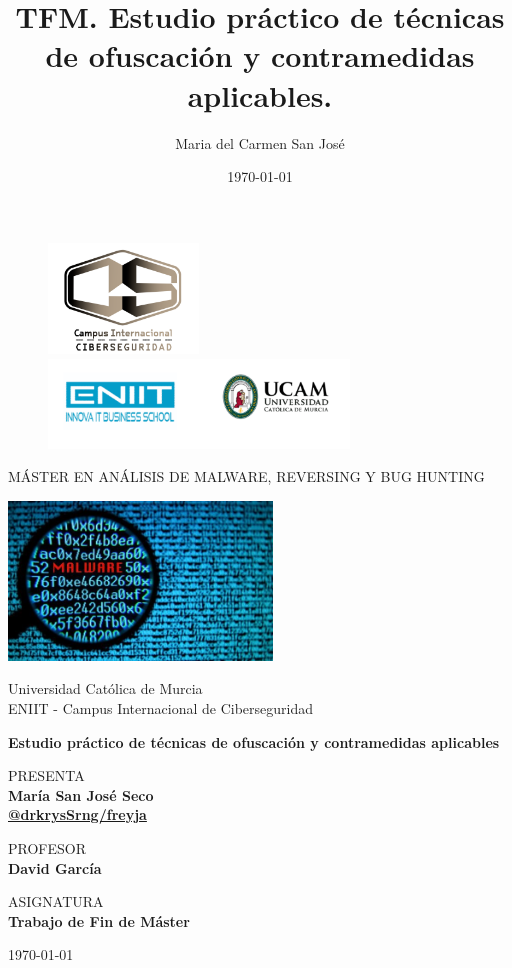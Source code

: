 \documentclass[15pt]{article}
\title{TFM. Estudio práctico de técnicas de ofuscación y contramedidas aplicables.}
\author{Maria del Carmen San José}
\date{\today}
\begin{document}
	
	\thispagestyle{empty}
	
	\begin{figure}[ht]
		\includegraphics[width=4cm]{images/logo.png}
		\endminipage
		\includegraphics[width=8cm]{images/logo_uni.png}
		\endminipage
	\end{figure}
	
	\begin{center}
		\vspace{0.5cm}
		\LARGE
		MÁSTER EN ANÁLISIS DE MALWARE, REVERSING Y BUG HUNTING
		
		\vspace{0.8cm}
		\centering
		\includegraphics[width=7cm]{images/front1.jpeg}
		
		
		\vspace{0.5cm}
		\LARGE
		Universidad Católica de Murcia\\
		ENIIT - Campus Internacional de Ciberseguridad
		
		
		\vspace{0.5cm}	
		\Large
		\textbf{Estudio práctico de técnicas de ofuscación y contramedidas aplicables}
		
		\vspace{0.5cm}
		\normalsize	
		PRESENTA \\
		\vspace{.3cm}
		\large
		\textbf{María San José Seco\\ \href{https://github.com/drkrysSrng/freyja}{@drkrysSrng/freyja} }
		
		\vspace{0.5cm}
		\normalsize	
		PROFESOR \\
		\vspace{.2cm}
		\large
		\textbf{David García}
		
		\vspace{0.5cm}
		\normalsize	
		ASIGNATURA \\
		\vspace{.2cm}
		\large
		\textbf{Trabajo de Fin de Máster}
		
		\vspace{0.5cm}
		\today
	\end{center}
	
\end{document}
